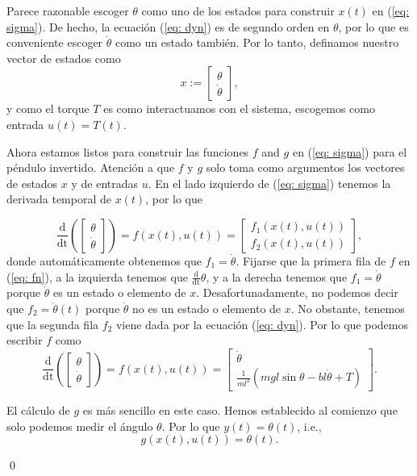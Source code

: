 \begin{example}
Parece razonable escoger $\theta$ como uno de los estados para construir $x(t)$ en (\ref{eq: sigma}). De hecho, la ecuación (\ref{eq: dyn}) es de segundo orden en $\theta$, por lo que es conveniente escoger $\dot\theta$ como un estado también. Por lo tanto, definamos nuestro vector de estados como
\begin{equation}
x := \begin{bmatrix}\theta \\ \dot\theta \end{bmatrix},
\end{equation}
y como el torque $T$ es como interactuamos con el sistema, escogemos como entrada $u(t) = T(t)$.

Ahora estamos listos para construir las funciones $f$ and $g$ en (\ref{eq: sigma}) para el péndulo invertido. Atención a que $f$ y $g$ solo toma como argumentos los vectores de estados $x$ y de entradas $u$. En el lado izquierdo de (\ref{eq: sigma}) tenemos la derivada temporal de $x(t)$, por lo que

\begin{equation}
	\frac{\mathrm{d}}{\mathrm{dt}}\left(\begin{bmatrix}\theta \\ \dot\theta \end{bmatrix}\right) = f(x(t), u(t)) = \begin{bmatrix}f_1(x(t), u(t)) \\ f_2(x(t), u(t))\end{bmatrix}, \label{eq: fn}
\end{equation}
donde automáticamente obtenemos que $f_1 = \dot\theta$. Fijarse que la primera fila de $f$ en (\ref{eq: fn}), a la izquierda tenemos que $\frac{\mathrm{d}}{\mathrm{dt}}\theta$, y a la derecha tenemos que $f_1 = \dot\theta$ porque $\dot\theta$ es un estado o elemento de $x$. Desafortunadamente, no podemos decir que $f_2 = \ddot\theta(t)$ porque $ \ddot\theta$ no es un estado o elemento de $x$. No obstante, tenemos que la segunda fila $f_2$ viene dada por la ecuación (\ref{eq: dyn}). Por lo que podemos escribir $f$ como
\begin{equation}
	\frac{\mathrm{d}}{\mathrm{dt}}\left(\begin{bmatrix}\theta \\ \dot\theta \end{bmatrix}\right) =  f(x(t), u(t)) = \begin{bmatrix} \dot\theta \\ \frac{1}{ml^2}\left(mgl\sin{\theta}-bl\dot\theta + T\right) \end{bmatrix}. \label{eq: f}
\end{equation}

El cálculo de $g$ es más sencillo en este caso. Hemos establecido al comienzo que solo podemos medir el ángulo $\theta$. Por lo que $y(t) = \theta(t)$, i.e.,
\begin{equation}
g(x(t),u(t)) =  \theta(t).
	\label{eq: g}
\end{equation}

\qed 
\end{example}

